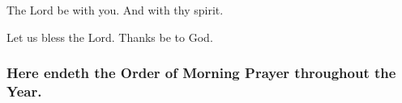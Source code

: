 \V The Lord be with you.  \R And with thy spirit.

\V Let us bless the Lord.  \R Thanks be to God.
\bigskip


\subsubsection{Here endeth the Order of Morning Prayer throughout the Year.}

\fleuron